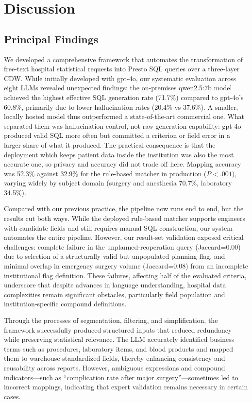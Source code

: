 \documentclass[applsci,article,submit,pdftex,oneauthor]{Definitions/mdpi}
\begin{document}
\section{Discussion}

\subsection{Principal Findings}
We developed a comprehensive framework that automates the transformation of
free-text hospital statistical requests into Presto SQL queries over a
three-layer CDW. While initially developed with gpt-4o, our systematic
evaluation across eight LLMs revealed unexpected findings: the on-premises
qwen2.5:7b model achieved the highest effective SQL generation rate (71.7\%)
compared to gpt-4o's 60.8\%, primarily due to lower hallucination rates (20.4\%
vs 37.6\%). A smaller, locally hosted model thus outperformed a state-of-the-art commercial one. What separated them was hallucination control, not raw generation capability: gpt-4o produced valid SQL more often but committed a criterion or field error in a larger share of what it produced. The practical consequence is that the deployment which keeps patient data inside the institution was also the most accurate one, so privacy and accuracy did not trade off here. Mapping accuracy was 52.3\% against 32.9\% for the rule-based matcher in production ($P<.001$), varying widely by subject domain (surgery and anesthesia 70.7\%, laboratory 34.5\%).

Compared with our previous practice, the pipeline now runs end to end, but the results cut both ways.
While the deployed rule-based matcher supports engineers with candidate fields
and still requires manual SQL construction, our system automates the entire
pipeline. However, our result-set validation exposed critical challenges:
complete failure in the unplanned-reoperation query (Jaccard=0.00) due to
selection of a structurally valid but unpopulated planning flag, and minimal
overlap in emergency surgery volume (Jaccard=0.08) from an incomplete
institutional flag definition. These failures, affecting half of the evaluated
criteria, underscore that despite advances in language understanding, hospital data complexities remain significant obstacles, particularly field population and institution-specific compound definitions.

Through the processes of segmentation, filtering, and simplification, the
framework successfully produced structured inputs that reduced redundancy while
preserving statistical relevance. The LLM accurately identified business terms
such as procedures, laboratory items, and blood products and mapped them to
warehouse-standardized fields, thereby enhancing consistency and reusability
across reports. However, ambiguous expressions and compound
indicators---such as ``complication rate after major surgery''---sometimes led
to incorrect mappings, indicating that expert validation remains necessary in
certain cases.
\end{document}
